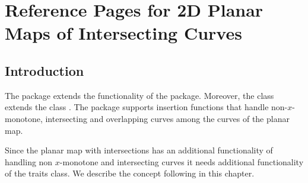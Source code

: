 


\clearpage
\section{Reference Pages for 2D Planar Maps of Intersecting Curves}

\subsection*{Introduction}

  The  package extends the
  functionality of the  package. Moreover, the class
   extends the class
  . The  package
  supports insertion functions that handle non-$x$-monotone,
  intersecting and overlapping curves among the curves of
  the planar map.

  Since the planar map with intersections has an additional
  functionality of handling non $x$-monotone and intersecting curves
  it needs additional functionality of the traits class. We describe
  the  concept following in
  this chapter. 



